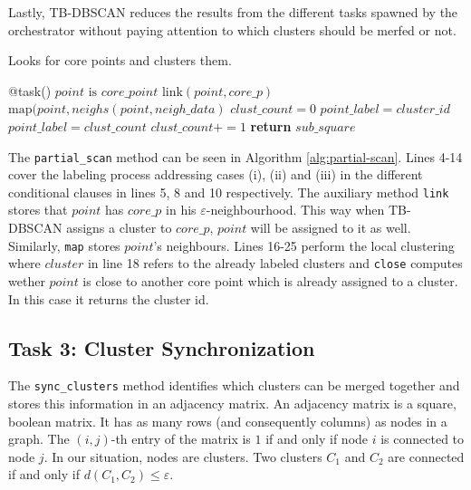 \documentclass[10pt,journal,compsoc]{IEEEtran}
\let\MYoriglatexcaption\caption
\renewcommand{\caption}[2][\relax]{\MYoriglatexcaption[#2]{#2}}
\begin{document}
Lastly, TB-DBSCAN reduces the results from the different tasks spawned by the orchestrator without paying attention to which clusters should be merfed or not.

\begin{algorithm}
  \caption{Looks for core points and clusters them. \label{alg:partial-scan}}
  \begin{algorithmic}[1]
    \State @task()
        \State {}
                \State $point \text{ is } core\_point $
                \Else
                    \State $\text{link}(point, core\_p)$
                \Else
                    \State $\text{map}(point, neighs(point, neigh\_data)$
                \EndIf
            \EndIf
        \EndFor
        \State {}
        \State $clust\_count = 0$
                \State $point\_label = cluster\_id$
            \Else 
                \State $point\_label = clust\_count$
                \State $clust\_count += 1$
            \EndIf
        \EndFor
        \State \textbf{return} $sub\_square$
    \EndFunction
  \end{algorithmic}
\end{algorithm}

The \texttt{partial\_scan} method can be seen in Algorithm \ref{alg:partial-scan}. Lines 4-14 cover the labeling process addressing cases (i), (ii) and (iii) in the different conditional clauses in lines 5, 8 and 10 respectively. The auxiliary method \texttt{link} stores that $point$ has $core\_p$ in his $\varepsilon$-neighbourhood. This way when TB-DBSCAN assigns a cluster to $core\_p$, $point$ will be assigned to it as well. Similarly, \texttt{map} stores $point$'s neighbours. Lines 16-25 perform the local clustering where $cluster$ in line 18 refers to the already labeled clusters and \texttt{close} computes wether $point$ is close to another core point which is already assigned to a cluster. In this case it returns the cluster id.


\subsection{Task 3: Cluster Synchronization} \label{subsec:cluster_sync}
The \texttt{sync\_clusters} method identifies which clusters can be merged together and stores this information in an adjacency matrix. An adjacency matrix is a square, boolean matrix. It has as many rows (and consequently columns) as nodes in a graph. The $(i,j)$-th entry of the matrix is $1$ if and only if node $i$ is connected to node $j$. In our situation, nodes are clusters. Two clusters $C_1$ and $C_2$ are connected if and only if $d(C_1, C_2) \leq \varepsilon$.
\end{document}
